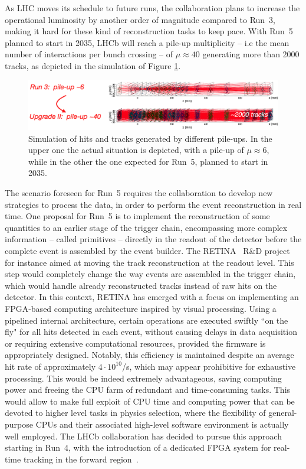 As LHC moves its schedule to future runs, the collaboration plans to increase the operational luminosity by another order of magnitude compared to Run~3, making it hard for these kind of reconstruction tasks to keep pace. With Run~5 planned to start in 2035, LHCb will reach a pile-up multiplicity -- i.e the mean number of interactions per bunch crossing -- of $\mu\approx 40$ generating more than 2000 tracks, as depicted in the simulation of Figure \ref{fig:velo_pile-up}. 

\begin{figure}
    \centering
    \includegraphics[width=\textwidth]{figures/VELO_pile-up.png}
    \caption{Simulation of hits and tracks generated by different pile-ups. In the upper one the actual situation is depicted, with a pile-up of $\mu\approx 6$, while in the other the one expected for Run~5, planned to start in 2035.}
    \label{fig:velo_pile-up}
\end{figure}

The scenario foreseen for Run~5 requires the collaboration to develop new strategies to process the data, in order to perform the event reconstruction in real time. One proposal for Run~5 is to implement the reconstruction of some quantities to an earlier stage of the trigger chain, encompassing  more complex information -- called primitives -- directly in the readout of the detector before the complete event is assembled by the event builder. The RETINA~\cite{refId0} R\&D project for instance aimed at moving the track reconstruction at the readout level. This step would completely change the way events are assembled in the trigger chain, which would handle already reconstructed tracks instead of raw hits on the detector. In this context, RETINA has emerged with a focus on implementing an FPGA-based computing architecture inspired by visual processing. Using a pipelined internal architecture, certain operations are executed swiftly ``on the fly" for all hits detected in each event, without causing delays in data acquisition or requiring extensive computational resources, provided the firmware is appropriately designed. Notably, this efficiency is maintained despite an average hit rate of approximately $4 \cdot 10^{10}$/s, which may appear prohibitive for exhaustive processing.
This would be indeed extremely advantageous, saving computing power and freeing the CPU farm of redundant and time-consuming tasks. This would allow to make full exploit of CPU time and computing power that can be devoted to higher level tasks in physics selection, where the flexibility of general-purpose CPUs and their associated high-level software environment is actually well employed. The LHCb collaboration has decided to pursue this approach starting in Run~4, with the introduction of a dedicated FPGA system for real-time tracking in the forward region~\cite{Morello:2888549}.

